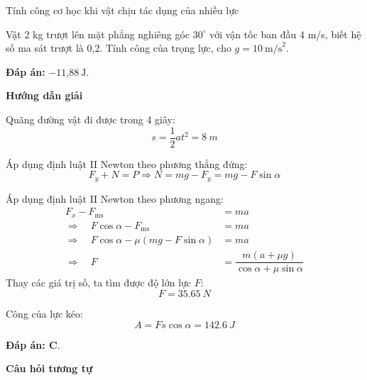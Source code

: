 \begin{dang}{Tính công cơ học khi vật chịu tác dụng của nhiều lực}
{			Vật 2 kg trượt lên mặt phẳng nghiêng góc $30^\circ$ với vận tốc ban đầu 4 m/s, biết hệ số ma sát trượt là 0,2. Tính công của trọng lực, cho $g=10\ \text{m/s}^2$.
			
			\textbf{Đáp án:} $-\text{11,88}\ \text{J}$.
		}
		{\begin{center}
				\textbf{Hướng dẫn giải}
			\end{center}
			
			Quãng đường vật đi được trong 4 giây:
			$$s=\dfrac{1}{2}at^2 = \SI{8}{m}$$
			
			Áp dụng định luật II Newton theo phương thẳng đứng:
			$$F_y + N =P\Rightarrow N = mg -F_y = mg - F \sin \alpha$$
			
			Áp dụng định luật II Newton theo phương ngang:
			\begin{align*}
				F_x - F_\text{ms} &= ma\\
				\Rightarrow\quad F \cos \alpha - F_\text{ms} &= ma\\
				\Rightarrow\quad F \cos \alpha -  \mu (mg - F \sin \alpha) &= ma\\
				\Rightarrow\quad F&=\dfrac{m(a+\mu g)}{\cos\alpha+\mu\sin\alpha}
			\end{align*}
			Thay các giá trị số, ta tìm được độ lớn lực $F$:
			$$F=\SI{35,65}{N}$$
			
			Công của lực kéo:
			$$A=Fs\cos \alpha  = \SI{142.6}{J}$$
			
			\textbf{Đáp án: C}.
			
			\begin{center}
				\textbf{Câu hỏi tương tự}
			\end{center}
			
}
\end{dang}
